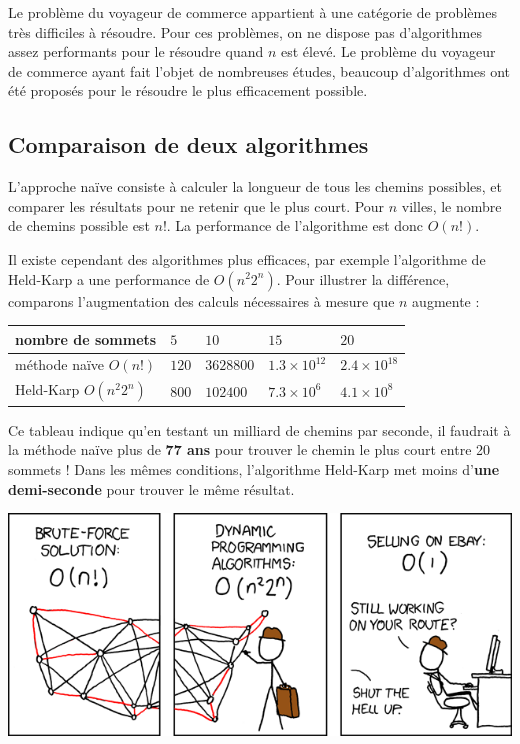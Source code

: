 Le problème du voyageur de commerce appartient à une catégorie de problèmes très difficiles à résoudre. Pour ces problèmes, on ne dispose pas d'algorithmes assez performants pour le résoudre quand $n$ est élevé. Le problème du voyageur de commerce ayant fait l'objet de nombreuses études, beaucoup d'algorithmes ont été proposés pour le résoudre le plus efficacement possible.

\subsection*{Comparaison de deux algorithmes}

L'approche naïve consiste à calculer la longueur de tous les chemins possibles, et comparer les résultats pour ne retenir que le plus court. Pour $n$ villes, le nombre de chemins possible est $n!$. La performance de l'algorithme est donc $O(n!)$.

Il existe cependant des algorithmes plus efficaces, par exemple l'algorithme de Held-Karp a une performance de $O(n^{2}2^n)$. Pour illustrer la différence, comparons l'augmentation des calculs nécessaires à mesure que $n$ augmente :

\begin{center}
  \begin{tabular}{|l|llll|}
    \hline
    nombre de sommets       & $5$   & $10$      & $15$            & $20$ \\
    \hline
    méthode naïve $O(n!)$   & $120$ & $3628800$ & $1.3 \times 10^{12}$ & $2.4 \times 10^{18}$ \\
    Held-Karp $O(n^{2}2^n)$ & $800$ & $102400$  & $7.3 \times 10^6$       & $4.1 \times 10^8$ \\
    \hline
  \end{tabular} 
\end{center}

Ce tableau indique qu'en testant un milliard de chemins par seconde, il faudrait à la méthode naïve plus de \textbf{77 ans} pour trouver le chemin le plus court entre 20 sommets ! Dans les mêmes conditions, l'algorithme Held-Karp met moins d'\textbf{une demi-seconde} pour trouver le même résultat.

  \begin{center}
    \includegraphics[width=\linewidth]{img/tsp_xkcd.png}
    \label{img:tsp_xkcd}
  \end{center}

